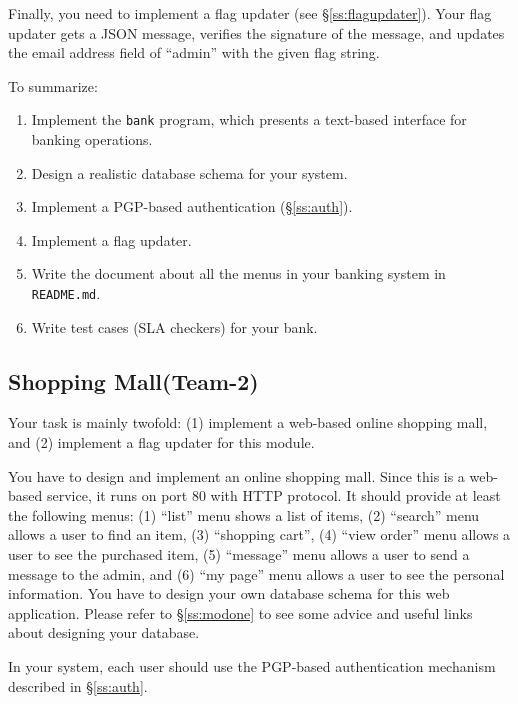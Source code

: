 \documentclass[a4paper, 11pt]{article}
\newcommand*{\Modtwo}{Shopping Mall\xspace}%
\theoremstyle{definition}
\begin{document}
{Finally, you need to implement a flag updater (see
\S\ref{ss:flagupdater}). Your flag updater gets a JSON message,
verifies the signature of the message, and updates the email address
field of ``admin'' with the given flag string.

To summarize:
\begin{enumerate}

  \item Implement the \texttt{bank} program, which presents a
    text-based interface for banking operations.

  \item Design a realistic database schema for your system.

  \item Implement a PGP-based authentication (\S\ref{ss:auth}).

  \item Implement a flag updater.

  \item Write the document about all the menus in your banking system
    in \texttt{README.md}.

  \item Write test cases (SLA checkers) for your bank.

\end{enumerate}

\subsection{\Modtwo (Team-2)}

Your task is mainly twofold: (1) implement a web-based online shopping
mall, and (2) implement a flag updater for this module.

You have to design and implement an online shopping mall. Since this
is a web-based service, it runs on port 80 with HTTP protocol. It
should provide at least the following menus: (1) ``list'' menu shows a
list of items, (2) ``search'' menu allows a user to find an item, (3)
``shopping cart'', (4) ``view order'' menu allows a user to see the
purchased item, (5) ``message'' menu allows a user to send a message
to the admin, and (6) ``my page'' menu allows a user to see the
personal information. You have to design your own database schema for
this web application. Please refer to \S\ref{ss:modone} to see some
advice and useful links about designing your database.

In your system, each user should use the PGP-based authentication
mechanism described in \S\ref{ss:auth}.

}
\end{document}
